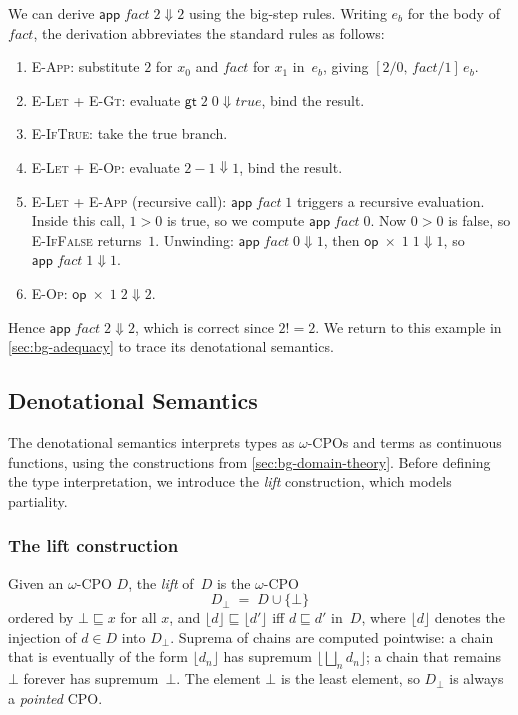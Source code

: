 We can derive $\mathsf{app}\;\mathit{fact}\;2 \Downarrow 2$ using the
big-step rules.  Writing $e_b$ for the body of $\mathit{fact}$, the
derivation abbreviates the standard rules as follows:
\begin{enumerate}
  \item \textsc{E-App}: substitute $2$ for $x_0$ and $\mathit{fact}$ for
    $x_1$ in~$e_b$, giving $[2/0,\,\mathit{fact}/1]\,e_b$.
  \item \textsc{E-Let} + \textsc{E-Gt}: evaluate $\mathsf{gt}\;2\;0
    \Downarrow \mathit{true}$, bind the result.
  \item \textsc{E-IfTrue}: take the true branch.
  \item \textsc{E-Let} + \textsc{E-Op}: evaluate $2 - 1 \Downarrow 1$,
    bind the result.
  \item \textsc{E-Let} + \textsc{E-App} (recursive call):
    $\mathsf{app}\;\mathit{fact}\;1$ triggers a recursive evaluation.
    Inside this call, $1 > 0$ is true, so we compute
    $\mathsf{app}\;\mathit{fact}\;0$.  Now $0 > 0$ is false, so
    \textsc{E-IfFalse} returns~$1$.  Unwinding:
    $\mathsf{app}\;\mathit{fact}\;0 \Downarrow 1$, then
    $\mathsf{op}\;{\times}\;1\;1 \Downarrow 1$, so
    $\mathsf{app}\;\mathit{fact}\;1 \Downarrow 1$.
  \item \textsc{E-Op}: $\mathsf{op}\;{\times}\;1\;2 \Downarrow 2$.
\end{enumerate}
Hence $\mathsf{app}\;\mathit{fact}\;2 \Downarrow 2$, which is correct
since $2! = 2$.  We return to this example in
\cref{sec:bg-adequacy} to trace its denotational semantics.


\subsection{Denotational Semantics}
\label{sec:bg-pcf-denotational}

The denotational semantics interprets types as $\omega$-CPOs and terms as
continuous functions, using the constructions from
\cref{sec:bg-domain-theory}.  Before defining the type interpretation, we
introduce the \emph{lift} construction, which models partiality.

\subsubsection*{The lift construction}

\begin{definition}[Lift]
\label{def:lift}
Given an $\omega$-CPO $D$, the \emph{lift} of~$D$ is the $\omega$-CPO
\[
  D_\bot \;=\; D \cup \{\bot\}
\]
ordered by $\bot \sqsubseteq x$ for all $x$, and $\lfloor d \rfloor
\sqsubseteq \lfloor d' \rfloor$ iff $d \sqsubseteq d'$ in~$D$, where
$\lfloor d \rfloor$ denotes the injection of $d \in D$ into $D_\bot$.
Suprema of chains are computed pointwise: a chain that is eventually
of the form $\lfloor d_n \rfloor$ has supremum
$\lfloor \bigsqcup_n d_n \rfloor$; a chain that remains $\bot$ forever
has supremum~$\bot$.  The element $\bot$ is the least element, so
$D_\bot$ is always a \emph{pointed} CPO.
\end{definition}

